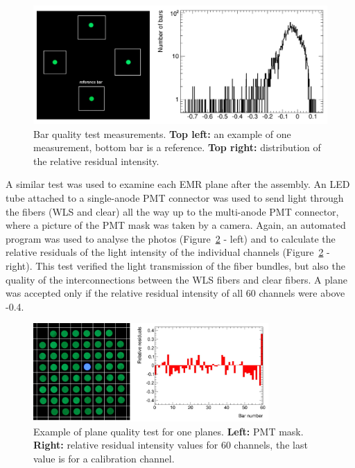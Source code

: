 \documentclass[a4paper,11pt]{article}
\begin{document}
\begin{figure}[htb]
 \centering
 \includegraphics[width=.8\textwidth]{./measurements_cut}
 \caption[Bar quality test measurements]{Bar quality test measurements. {\bf Top left:} an example of one measurement, bottom bar is a reference. {\bf Top
 right:} distribution of the relative residual intensity.}
 \label{fig:measurements}
\end{figure}

A similar test was used to examine each EMR plane after the assembly. An LED tube attached to a single-anode PMT connector was used to send light through
the fibers (WLS and clear) all the way up to the multi-anode PMT connector, where a picture of the PMT mask was taken by a camera. Again,  an automated
program was used to analyse the photos (Figure~\ref{fig:plane_tests_one_planes} - left) and to calculate the relative residuals of the light intensity
of the individual channels (Figure~\ref{fig:plane_tests_one_planes} - right). This test verified the light transmission of the fiber bundles, but also
the quality of the interconnections between the WLS fibers and clear fibers. A plane was accepted only if the relative residual intensity of all 60
channels were above -0.4.

\begin{figure}[htb]
 \centering
 \includegraphics[width=0.8\textwidth]{./one_planes}
 \caption[Example of plane quality tests]{Example of plane quality test for one planes. {\bf Left:} PMT mask. {\bf Right:} relative residual intensity values
 for 60 channels, the last value is for a calibration channel.}
 \label{fig:plane_tests_one_planes}
\end{figure}
\end{document}
